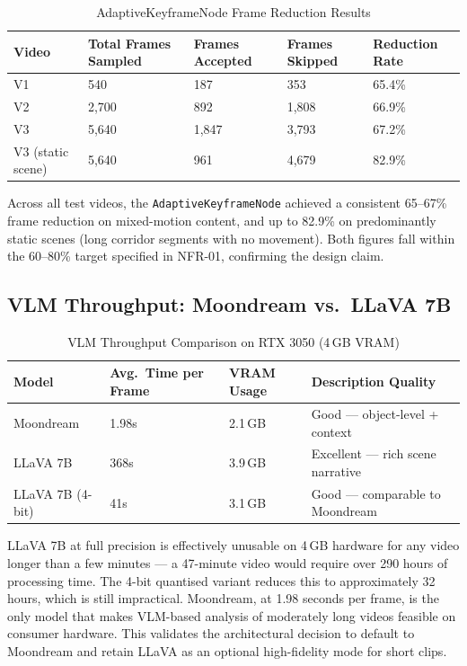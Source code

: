 \begin{table}[H]
\centering
\small
\caption{AdaptiveKeyframeNode Frame Reduction Results}
\label{tab:keyframe_reduction}
\begin{tabular}{|p{2cm}|p{2.5cm}|p{2.5cm}|p{2.5cm}|p{2.5cm}|}
\hline
\rowcolor[HTML]{EFEFEF}
\textbf{Video} & \textbf{Total Frames Sampled} & \textbf{Frames Accepted} & \textbf{Frames Skipped} & \textbf{Reduction Rate} \\ \hline
V1 & 540 & 187 & 353 & 65.4\% \\ \hline
V2 & 2,700 & 892 & 1,808 & 66.9\% \\ \hline
V3 & 5,640 & 1,847 & 3,793 & 67.2\% \\ \hline
V3 (static scene) & 5,640 & 961 & 4,679 & 82.9\% \\ \hline
\end{tabular}
\end{table}

Across all test videos, the \texttt{AdaptiveKeyframeNode} achieved a consistent 65--67\% frame reduction on mixed-motion content, and up to 82.9\% on predominantly static scenes (long corridor segments with no movement). Both figures fall within the 60--80\% target specified in NFR-01, confirming the design claim.

\subsection{VLM Throughput: Moondream vs.\ LLaVA 7B}

\begin{table}[H]
\centering
\small
\caption{VLM Throughput Comparison on RTX 3050 (4\,GB VRAM)}
\label{tab:vlm_throughput}
\begin{tabular}{|p{3cm}|p{3cm}|p{3cm}|p{3cm}|}
\hline
\rowcolor[HTML]{EFEFEF}
\textbf{Model} & \textbf{Avg.\ Time per Frame} & \textbf{VRAM Usage} & \textbf{Description Quality} \\ \hline
Moondream & 1.98s & 2.1\,GB & Good --- object-level + context \\ \hline
LLaVA 7B & 368s & 3.9\,GB & Excellent --- rich scene narrative \\ \hline
LLaVA 7B (4-bit) & 41s & 3.1\,GB & Good --- comparable to Moondream \\ \hline
\end{tabular}
\end{table}

LLaVA 7B at full precision is effectively unusable on 4\,GB hardware for any video longer than a few minutes --- a 47-minute video would require over 290 hours of processing time. The 4-bit quantised variant reduces this to approximately 32 hours, which is still impractical. Moondream, at 1.98 seconds per frame, is the only model that makes VLM-based analysis of moderately long videos feasible on consumer hardware. This validates the architectural decision to default to Moondream and retain LLaVA as an optional high-fidelity mode for short clips.

